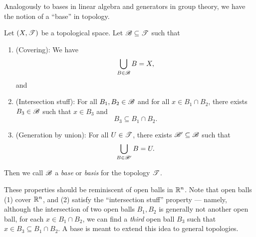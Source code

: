 \documentclass{fkpaper}
\begin{document}
\begin{multicols}{2}

  Analogously to bases in linear algebra and generators in group
  theory, we have the notion of a ``base'' in topology.

  \begin{definition}[Base]\label{def:base}
    Let $(X, {\mathscr{T}})$ be a topological space. Let ${\mathscr{B}} \subseteq {\mathscr{T}}$ such that
    \begin{enumerate}
      \item (Covering): We have
        \[
        \bigcup_{B \in {\mathscr{B}}} B = X,
        \]
        and
      \item (Intersection stuff): For all $B_1, B_2 \in {\mathscr{B}}$ and
        for all $x \in B_1 \cap B_2$, there exists $B_3 \in {\mathscr{B}}$
        such that $x \in B_3$ and
        \[
        B_3 \subseteq B_1 \cap B_2.
        \]
      \item (Generation by union): For all $U \in {\mathscr{T}}$, there exists
        ${\mathscr{B}}' \subseteq {\mathscr{B}}$ such that
        \[
        \bigcup_{B \in {\mathscr{B}}'} B = U.
        \]
    \end{enumerate}
    Then we call ${\mathscr{B}}$ a \emph{base} or \emph{basis} for the
    topology ${\mathscr{T}}$.
  \end{definition}
  These properties should be reminiscent of open balls in $\mathbb{R}^n$.
  Note that open balls (1) cover $\mathbb{R}^n$, and (2) satisfy the
  ``intersection stuff'' property --- namely, although the
  intersection of two open balls $B_1, B_2$ is generally not another
  open ball, for each $x \in B_1 \cap B_2$, we can find a \emph{third}
  open ball $B_3$ such that $x \in B_3 \subseteq B_1 \cap B_2$. A base
  is meant to extend this idea to general topologies.


\end{multicols}
\end{document}
